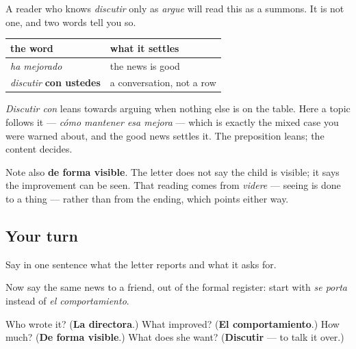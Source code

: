 \begin{grammarlens}[title={Grammar Lens: what the letter is not doing}]
A reader who knows \emph{discutir} only as \emph{argue} will read this as a summons. It is not one, and two words tell you so.

\noindent
\begin{tabularx}{\linewidth}{@{}>{\raggedright\arraybackslash}X>{\raggedright\arraybackslash}X@{}}
\toprule
\textbf{the word} & \textbf{what it settles} \\
\midrule
\emph{ha mejorado} & the news is good \\
\emph{discutir} \textbf{con ustedes} & a conversation, not a row \\
\bottomrule
\end{tabularx}

\emph{Discutir con} leans towards arguing when nothing else is on the table. Here a topic follows it — \emph{cómo mantener esa mejora} — which is exactly the mixed case you were warned about, and the good news settles it. The preposition leans; the content decides.

Note also \textbf{de forma visible}. The letter does not say the child is visible; it says the improvement can be seen. That reading comes from \emph{videre} — seeing is done to a thing — rather than from the ending, which points either way.
\end{grammarlens}

\subsection*{Your turn}
Say in one sentence what the letter reports and what it asks for.

Now say the same news to a friend, out of the formal register: start with \emph{se porta} instead of \emph{el comportamiento}.

\begin{tcolorbox}[breakable,colback=teal!4,colframe=teal!35!black,title={Before you move on}]
Who wrote it? (\textbf{La directora}.) What improved? (\textbf{El comportamiento}.) How much? (\textbf{De forma visible}.) What does she want? (\textbf{Discutir} — to talk it over.)
\end{tcolorbox}
